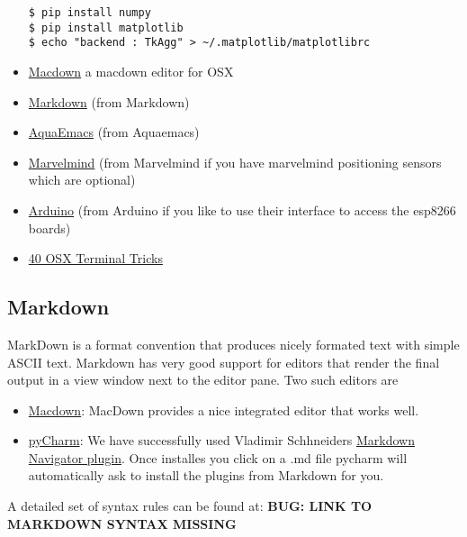 \begin{itemize}
\begin{verbatim}
$ pip install numpy
$ pip install matplotlib
$ echo "backend : TkAgg" > ~/.matplotlib/matplotlibrc
\end{verbatim}
\item
  \href{https://macdown.uranusjr.com/}{Macdown} a macdown editor for OSX
\item
  \href{https://blog.ghost.org/markdown/}{Markdown} (from Markdown)
\item
  \href{http://oracc.museum.upenn.edu/doc/help/usingemacs/aquamacs/}{AquaEmacs}
  (from Aquaemacs)
\item
  \href{http://marvelmind.com/}{Marvelmind} (from Marvelmind if you have
  marvelmind positioning sensors which are optional)
\item
  \href{https://www.arduino.cc/en/guide/macOSX}{Arduino} (from Arduino
  if you like to use their interface to access the esp8266 boards)
\item
  \href{https://computers.tutsplus.com/tutorials/40-terminal-tips-and-tricks-you-never-thought-you-needed--mac-51192}{40
  OSX Terminal Tricks}
\end{itemize}

\subsection{Markdown}\label{markdown}

MarkDown is a format convention that produces nicely formated text with
simple ASCII text. Markdown has very good support for editors that
render the final output in a view window next to the editor pane. Two
such editors are

\begin{itemize}
\tightlist
\item
  \href{https://macdown.uranusjr.com/}{Macdown}: MacDown provides a nice
  integrated editor that works well.
\item
  \href{https://www.jetbrains.com/pycharm/download/download-thanks.html?platform=mac\&code=PCC}{pyCharm}:
  We have successfully used Vladimir Schhneiders
  \href{https://plugins.jetbrains.com/plugin/7896-markdown-navigator}{Markdown
  Navigator plugin}. Once installes you click on a .md file pycharm will
  automatically ask to install the plugins from Markdown for you.
\end{itemize}

A detailed set of syntax rules can be found at: \textbf{BUG: LINK TO
MARKDOWN SYNTAX MISSING}

